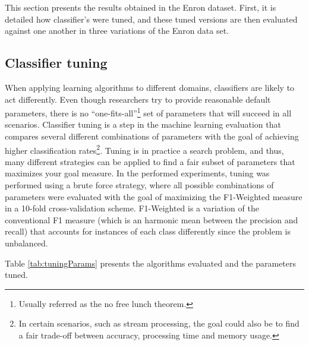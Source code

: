 \documentclass[11pt]{article}
\begin{document}
	This section presents the results obtained in the Enron dataset.
	First, it is detailed how classifier's were tuned, and these tuned versions are then evaluated against one another in three variations of the Enron data set.

	\subsection{Classifier tuning}
	
	
		When applying learning algorithms to different domains, classifiers are likely to act differently.
		Even though researchers try to provide reasonable default parameters, there is no ``one-fits-all''\footnote{Usually referred as the no free lunch theorem.} set of parameters that will succeed in all scenarios.
		Classifier tuning is a step in the machine learning evaluation that compares several different combinations of parameters with the goal of achieving higher classification rates\footnote{In certain scenarios, such as stream processing, the goal could also be to find a fair trade-off between accuracy, processing time and memory usage.}.
		Tuning is in practice a search problem, and thus, many different strategies can be applied to find a fair subset of parameters that maximizes your goal measure.
		In the performed experiments, tuning was performed using a brute force strategy, where all possible combinations of parameters were evaluated with the goal of maximizing the F1-Weighted measure in a 10-fold cross-validation scheme.
		F1-Weighted is a variation of the conventional F1 measure (which is an harmonic mean between the precision and recall) that accounts for instances of each class differently since the problem is unbalanced.
	
		Table \ref{tab:tuningParams} presents the algorithms evaluated and the parameters tuned.
		
\end{document}
